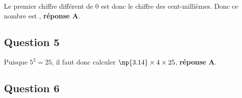 Le premier chiffre différent de $0$ est donc le chiffre des cent-millièmes. Donc ce nombre est , \textbf{réponse A}.
\subsection*{Question 5}



















Puisque \mbox{$5^2=25$}, il faut donc calculer \mbox{$\np{3.14}\times4\times25$}, \textbf{réponse A}.
\subsection*{Question 6}



























































































